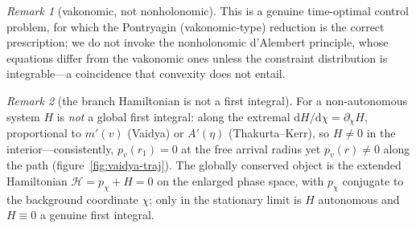\documentclass[12pt]{iopart}
\newcommand{\dd}{\mathrm{d}}
\theoremstyle{plain}
\theoremstyle{definition}
\theoremstyle{plain}
\theoremstyle{remark}
\newtheorem*{remark}{Remark}
\begin{document}
\begin{remark}[vakonomic, not nonholonomic]
This is a genuine time-optimal control problem, for which the Pontryagin
(vakonomic-type) reduction is the correct prescription; we do not invoke the nonholonomic
d'Alembert principle, whose equations differ from the vakonomic ones unless the constraint
distribution is integrable---a coincidence that convexity does not entail.
\end{remark}

\begin{remark}[the branch Hamiltonian is not a first integral]
For a non-autonomous system $H$ is \emph{not} a global first integral: along the
extremal $\dd H/\dd\chi=\partial_\chi H$, proportional to $m'(v)$ (Vaidya) or $A'(\eta)$
(Thakurta--Kerr), so $H\neq0$ in the interior---consistently, $p_v(r_1)=0$ at the
free arrival radius yet $p_v(r)\neq0$ along the path (figure~\ref{fig:vaidya-traj}).
The globally conserved object is the extended Hamiltonian $\mathcal H=p_\chi+H=0$ on
the enlarged phase space, with $p_\chi$ conjugate to the background coordinate $\chi$; only
in the stationary limit is $H$ autonomous and $H\equiv0$ a genuine first integral.
\end{remark}
\end{document}
